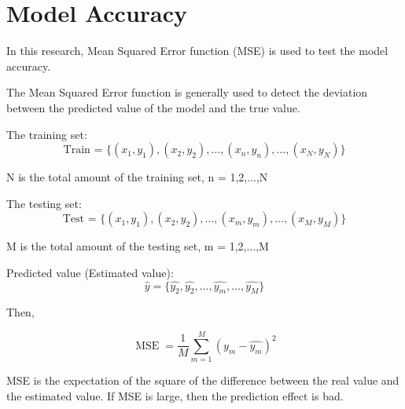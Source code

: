 \section{Model Accuracy} %

In this research, Mean Squared Error function (MSE) is used to test the model accuracy.

The Mean Squared Error function is generally used to detect the deviation between the predicted value of the model and the true value.

The training set: 
$$\text{Train = } \{({x_{1}},{y_{1}}),({x_{2}},{y_{2}}),\ldots,({x_{n}},{y_{n}}),\ldots,({x_{N}},{y_{N}})\}$$

N is the total amount of the training set, n = 1,2,...,N

The testing set:
$$\text{Test = } \{({x_{1}},{y_{1}}),({x_{2}},{y_{2}}),\ldots,({x_{m}},{y_{m}}),\ldots,({x_{M}},{y_{M}})\}$$

M is the total amount of the testing set, m = 1,2,...,M

Predicted value (Estimated value):  
$${\hat y} = \{{\hat {y_{2}}},{\hat {y_{2}}},\ldots,{\hat {y_{m}}},\ldots,{\hat {y_{M}}}\}$$

Then,

$${\displaystyle \operatorname {MSE} ={\frac {1}{M}}\sum _{m=1}^{M}(y_{m}-{\hat {y_{m}}})^{2}}$$

MSE is the expectation of the square of the difference between the real value and the estimated value. If MSE is large, then the prediction effect is bad.